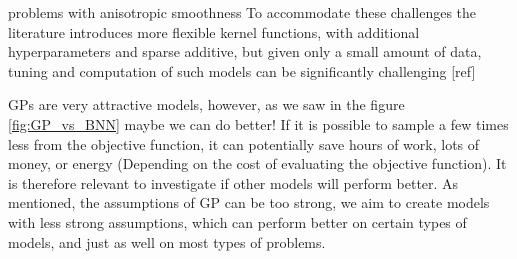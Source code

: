 problems with anisotropic smoothness To accommodate these challenges the literature introduces more
flexible kernel functions, with additional hyperparameters and sparse additive, but given only a
small amount of data, tuning and computation of such models can be significantly challenging [ref]











GPs are very attractive models, however, as we saw in the figure \ref{fig:GP_vs_BNN} maybe we can do
better! If it is possible to sample a few times less from the objective function, it can potentially
save hours of work, lots of money, or energy (Depending on the cost of evaluating the objective
function). It is therefore relevant to investigate if other models will perform better. As
mentioned, the assumptions of GP can be too strong, we aim to create models with less strong
assumptions, which can perform better on certain types of models, and just as well on most types of  
problems. 

